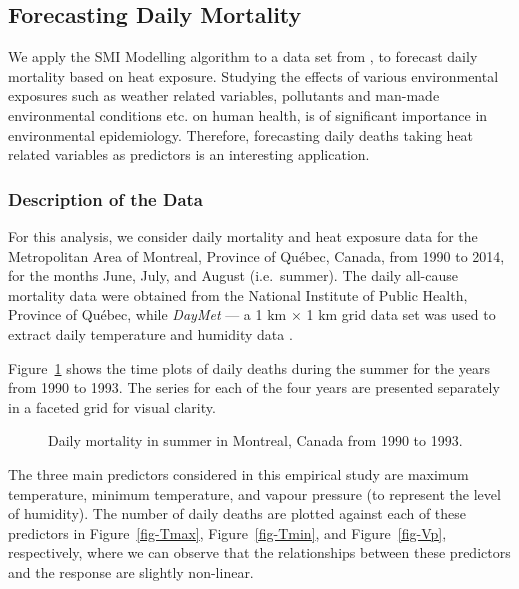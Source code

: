 \documentclass[
  11pt,
  a4paper,
]{article}
\begin{document}
\subsection{Forecasting Daily Mortality}\label{sec-mortality}

We apply the SMI Modelling algorithm to a data set from
\textcite{Masselot2022}, to forecast daily mortality based on heat
exposure. Studying the effects of various environmental exposures such
as weather related variables, pollutants and man-made environmental
conditions etc. on human health, is of significant importance in
environmental epidemiology. Therefore, forecasting daily deaths taking
heat related variables as predictors is an interesting application.

\subsubsection{Description of the Data}\label{description-of-the-data}

For this analysis, we consider daily mortality and heat exposure data
for the Metropolitan Area of Montreal, Province of Québec, Canada, from
1990 to 2014, for the months June, July, and August (i.e.~summer). The
daily all-cause mortality data were obtained from the National Institute
of Public Health, Province of Québec, while \emph{DayMet} --- a 1 km × 1
km grid data set \autocite{Thornton2021} was used to extract daily
temperature and humidity data \autocite{Masselot2022}.

Figure~\ref{fig-deaths} shows the time plots of daily deaths during the
summer for the years from 1990 to 1993. The series for each of the four
years are presented separately in a faceted grid for visual clarity.

\begin{figure}


\caption{\label{fig-deaths}Daily mortality in summer in Montreal, Canada
from 1990 to 1993.}

\end{figure}%

The three main predictors considered in this empirical study are maximum
temperature, minimum temperature, and vapour pressure (to represent the
level of humidity). The number of daily deaths are plotted against each
of these predictors in Figure~\ref{fig-Tmax}, Figure~\ref{fig-Tmin}, and
Figure~\ref{fig-Vp}, respectively, where we can observe that the
relationships between these predictors and the response are slightly
non-linear.
\end{document}
